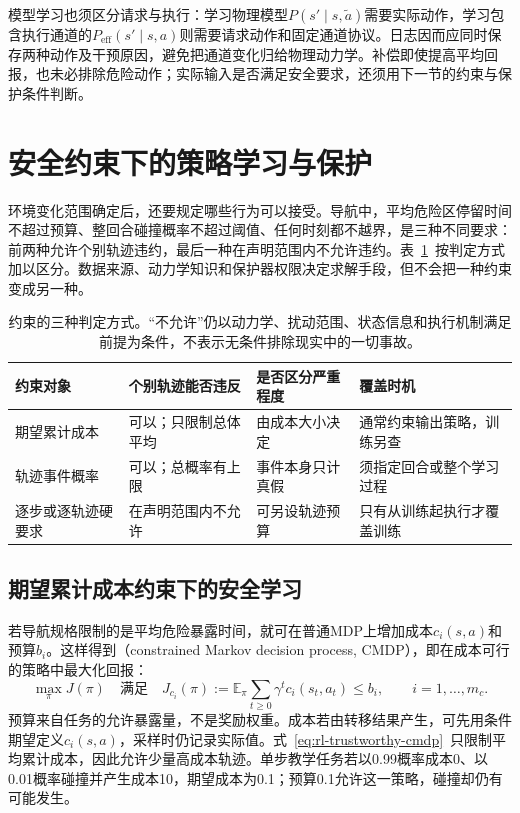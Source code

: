 模型学习也须区分请求与执行：学习物理模型$P(s'\mid s,\widetilde a)$需要实际动作，学习包含执行通道的$P_{\mathrm{eff}}(s'\mid s,a)$则需要请求动作和固定通道协议。日志因而应同时保存两种动作及干预原因，避免把通道变化归给物理动力学。补偿即使提高平均回报，也未必排除危险动作；实际输入是否满足安全要求，还须用下一节的约束与保护条件判断。

\section{安全约束下的策略学习与保护}
\label{sec:rl-trustworthy-safety}

环境变化范围确定后，还要规定哪些行为可以接受。导航中，平均危险区停留时间不超过预算、整回合碰撞概率不超过阈值、任何时刻都不越界，是三种不同要求：前两种允许个别轨迹违约，最后一种在声明范围内不允许违约。表~\ref{tab:rl-trustworthy-constraint-types}~按判定方式加以区分。数据来源、动力学知识和保护器权限决定求解手段，但不会把一种约束变成另一种。

\begin{table}[htbp]
  \centering
  \begin{tabularx}{\linewidth}{@{}>{\raggedright\arraybackslash}p{22mm}XXX@{}}
    \toprule
    约束对象 & 个别轨迹能否违反 & 是否区分严重程度 & 覆盖时机 \\
    \midrule
    期望累计成本 & 可以；只限制总体平均 & 由成本大小决定 & 通常约束输出策略，训练另查 \\
    轨迹事件概率 & 可以；总概率有上限 & 事件本身只计真假 & 须指定回合或整个学习过程 \\
    逐步或逐轨迹硬要求 & 在声明范围内不允许 & 可另设轨迹预算 & 只有从训练起执行才覆盖训练 \\
    \bottomrule
  \end{tabularx}
  \caption{约束的三种判定方式。“不允许”仍以动力学、扰动范围、状态信息和执行机制满足前提为条件，不表示无条件排除现实中的一切事故。}
  \label{tab:rl-trustworthy-constraint-types}
\end{table}

\subsection{期望累计成本约束下的安全学习}
\label{sec:rl-trustworthy-cmdp}

若导航规格限制的是平均危险暴露时间，就可在普通MDP上增加成本$c_i(s,a)$和预算$b_i$。这样得到（constrained Markov decision process, CMDP），即在成本可行的策略中最大化回报：
\begin{equation}
  \max_\pi J(\pi)
  \quad\text{满足}\quad
  J_{c_i}(\pi):=\mathbb E_\pi\sum_{t\geq0}\gamma^tc_i(s_t,a_t)
       \leq b_i,\qquad i=1,\ldots,m_c.
  \label{eq:rl-trustworthy-cmdp}
\end{equation}
预算来自任务的允许暴露量，不是奖励权重。成本若由转移结果产生，可先用条件期望定义$c_i(s,a)$，采样时仍记录实际值。式~\eqref{eq:rl-trustworthy-cmdp}~只限制平均累计成本，因此允许少量高成本轨迹。单步教学任务若以0.99概率成本0、以0.01概率碰撞并产生成本10，期望成本为0.1；预算0.1允许这一策略，碰撞却仍有可能发生。

